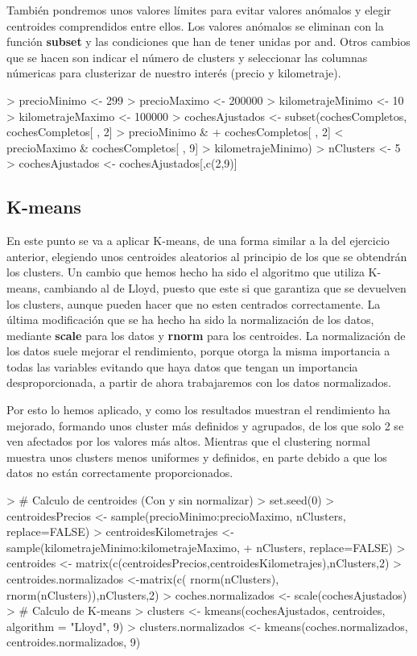 \documentclass[a4paper]{article}
\begin{document}
También pondremos unos valores límites para evitar valores anómalos y elegir centroides comprendidos entre ellos. Los valores anómalos se eliminan con la función \textbf{subset} y las condiciones que han de tener unidas por and. Otros cambios que se hacen son indicar el número de clusters y seleccionar las columnas númericas para clusterizar de nuestro interés (precio y kilometraje).
\begin{Schunk}
\begin{Sinput}
> precioMinimo <- 299
> precioMaximo <- 200000
> kilometrajeMinimo <- 10
> kilometrajeMaximo <- 100000
> cochesAjustados <- subset(cochesCompletos, cochesCompletos[ , 2] > precioMinimo & 
+     cochesCompletos[ , 2] < precioMaximo & cochesCompletos[ , 9] > kilometrajeMinimo)
> nClusters <- 5
> cochesAjustados <- cochesAjustados[,c(2,9)]
\end{Sinput}
\end{Schunk}
\subsection{K-means}
En este punto se va a aplicar K-means, de una forma similar a la del ejercicio anterior, elegiendo unos centroides aleatorios al principio de los que se obtendrán los clusters. Un cambio que hemos hecho ha sido el algoritmo que utiliza K-means, cambiando al de Lloyd, puesto que este si que garantiza que se devuelven los clusters, aunque pueden hacer que no esten centrados correctamente. La última modificación que se ha hecho ha sido la normalización de los datos, mediante \textbf{scale} para los datos y \textbf{rnorm} para los centroides. La normalización de los datos suele mejorar el rendimiento, porque otorga la misma importancia a todas las variables evitando que haya datos que tengan un importancia desproporcionada, a partir de ahora trabajaremos con los datos normalizados.   

Por esto lo hemos aplicado, y como los resultados muestran el rendimiento ha mejorado, formando unos cluster más definidos y agrupados, de los que solo 2 se ven afectados por los valores más altos. Mientras que el clustering normal muestra unos clusters menos uniformes y definidos, en parte debido a que los datos no están correctamente proporcionados.
\begin{Schunk}
\begin{Sinput}
> # Calculo de centroides (Con y sin normalizar)
> set.seed(0)
> centroidesPrecios <- sample(precioMinimo:precioMaximo, nClusters, replace=FALSE)
> centroidesKilometrajes <- sample(kilometrajeMinimo:kilometrajeMaximo, 
+                        nClusters, replace=FALSE)
> centroides <- matrix(c(centroidesPrecios,centroidesKilometrajes),nClusters,2)
> centroides.normalizados <-matrix(c( rnorm(nClusters), rnorm(nClusters)),nClusters,2)
> coches.normalizados <- scale(cochesAjustados)
> # Calculo de K-means
> clusters <- kmeans(cochesAjustados, centroides, algorithm = "Lloyd", 9)
> clusters.normalizados <- kmeans(coches.normalizados, centroides.normalizados, 9)
\end{Sinput}
\end{Schunk}
\end{document}
